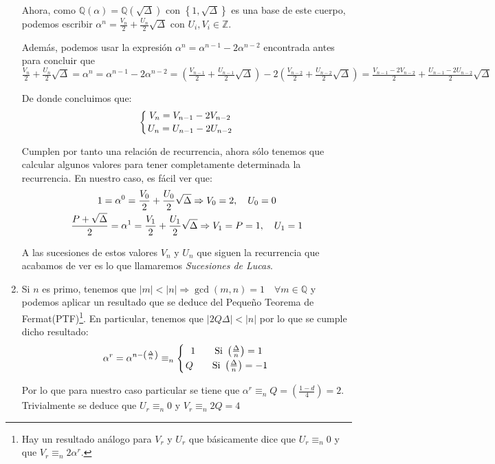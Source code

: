 \begin{enumerate}
		Ahora, como $\mathbb{Q\left(\alpha\right)} = \mathbb{Q\left(\sqrt{\Delta}\right)}$ con $\left\lbrace1,
		\sqrt{\Delta}\right\rbrace$ es una base de este cuerpo, podemos escribir $\displaystyle \alpha^n =
		\frac{V_n}{2} + \frac{U_n}{2}\sqrt{\Delta}$ con $U_i, V_i \in \mathbb{Z}$.
		
		Además, podemos usar la expresión $\alpha^n  = \alpha^{n-1} - 2\alpha^{n-2}$ encontrada antes para
		concluir que $\displaystyle \frac{V_n}{2} + \frac{U_n}{2}\sqrt{\Delta} = \alpha^n  = \alpha^{n-1} -
		2\alpha^{n-2} = \left(\frac{V_{n-1}}{2} + \frac{U_{n-1}}{2}\sqrt{\Delta}\right) -2\left(\frac{V_{n-2}}{2} +
		\frac{U_{n-2}}{2}\sqrt{\Delta}\right) = \frac{V_{n-1}-2V_{n-2}}{2} + \frac{U_{n-1}-2U_{n-2}}{2}\sqrt{\Delta}$
		
		De donde concluimos que:
		$$\left\lbrace
			V_n = V_{n-1}-2V_{n-2} \atop
			U_n = U_{n-1}-2U_{n-2}
		\right.$$
		
		Cumplen por tanto una relación de recurrencia, ahora sólo tenemos que calcular algunos valores para tener
		completamente determinada la recurrencia. En nuestro caso, es fácil ver que:
		$$\left.
			\displaystyle 1 = \alpha^0 = \frac{V_0}{2} + \frac{U_0}{2}\sqrt{\Delta} \Rightarrow V_0 = 2, \quad U_0 = 0 \atop
			\displaystyle \frac{P + \sqrt{\Delta}}{2} = \alpha^1 = \frac{V_1}{2} + \frac{U_1}{2}\sqrt{\Delta}\Rightarrow V_1 = P = 1, \quad U_1 = 1 
		\right.$$
		
		A las sucesiones de estos valores $V_n$ y $U_n$ que siguen la recurrencia que acabamos de ver es lo que
		llamaremos \textit{Sucesiones de Lucas}.
		
		\item Si $n$ es primo, tenemos que $\displaystyle |m| < |n| \Rightarrow \gcd(m, n) = 1 \quad \forall m \in
		\mathbb{Q}$ y podemos aplicar un resultado que se deduce del Pequeño Teorema de Fermat(PTF)\footnote{Hay un
		resultado análogo para $V_r$ y $U_r$ que básicamente dice que $U_r \equiv_n 0$ y que $V_r \equiv_n 2\alpha^r$.}.
		En particular, tenemos que $|2Q\Delta| < |n|$ por lo que se cumple dicho resultado:
		$$\alpha^r = \alpha^{n-\left(\frac{\Delta}{n}\right)} \equiv_n \left\lbrace
			1 \qquad \text{Si } \left(\frac{\Delta}{n}\right) = 1 \atop
			Q \qquad \text{Si } \left(\frac{\Delta}{n}\right) = -1
		\right.$$
		
		Por lo que para nuestro caso particular se tiene que $\displaystyle \alpha^r \equiv_n Q = \left(\frac{1-d}
		{4}\right) = 2$. Trivialmente se deduce que $U_r \equiv_n 0$ y $V_r \equiv_n 2Q = 4$
	\end{enumerate}

